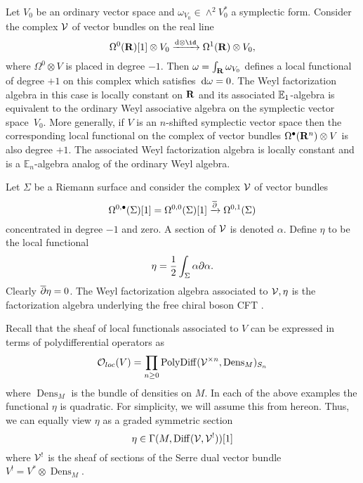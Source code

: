 \documentclass[11pt]{amsart}
\renewcommand{\op}{\operatorname}
\begin{document}
\begin{eg}
Let $V_0$ be an ordinary vector space and $\omega_{V_0} \in \wedge^2 V_0^*$ a symplectic form.
Consider the complex $\mathcal V$ of vector bundles on the real line
\begin{equation}
\Omega^0(\R) [1]\otimes V_0 \xto{\d \otimes \id} \Omega^1 (\R) \otimes V_0 ,
\end{equation}
where $\Omega^0\otimes V$ is placed in degree $-1$.
Then $\omega = \int_{\mathbf{R}} \omega_{V_0}$ defines a local functional of degree $+1$ on this complex which satisfies~${\rm d} \omega = 0$.
The Weyl factorization algebra in this case is locally constant on $\mathbf{R}$ and its associated $\mathbb E_1$-algebra is equivalent to the ordinary Weyl associative algebra on the symplectic vector space~$V_0$.
More generally, if $V$ is an $n$-shifted symplectic vector space then the corresponding local functional on the complex of vector bundles $\Omega^\bullet(\mathbf{R}^n) \otimes V$ is also degree $+1$.
The associated Weyl factorization algebra is locally constant and is a $\mathbb{E}_n$-algebra analog of the ordinary Weyl algebra.
\end{eg}

\begin{eg}
  Let $\Sigma$ be a Riemann surface and consider the complex $\mathcal V$ of vector bundles
  \begin{equation}
    \Omega^{0,\bullet}(\Sigma)[1] = \Omega^{0,0}(\Sigma)[1] \xrightarrow{\overline{\partial}} \Omega^{0,1}(\Sigma)
  \end{equation}
  concentrated in degree $-1$ and zero.
  A section of $\mathcal V$ is denoted $\alpha$.
  Define $\eta$ to be the local functional
  \begin{equation}
    \eta = \frac12 \int_{\Sigma}\alpha \partial \alpha .
  \end{equation}
  Clearly $\overline{\partial} \eta = 0$.
  The Weyl factorization algebra associated to $\mathcal V,\eta$ is the factorization algebra underlying the free chiral boson CFT \cite[??]{CG}.
\end{eg}

Recall that the sheaf of local functionals associated to $V$ can be expressed in terms of polydifferential operators as
\begin{equation}
\oloc(V)= \prod_{n \geq 0} \op{PolyDiff}(\cV^{\times n} , \op{Dens}_{M})_{{S_{n}}}
\end{equation}
where $\op{Dens}_{M}$ is the bundle of densities on $M$.
In each of the above examples the functional $\eta$ is quadratic.
For simplicity, we will assume this from hereon.
Thus, we can equally view $\eta$ as a graded symmetric section
\begin{equation}
\eta \in \Gamma(M, \op{Diff}(\cV, \cV^!))[1]
\end{equation}
where $\mathcal V^{!}$ is the sheaf of sections of the Serre dual vector bundle $V^{!} = V^{*} \otimes \op{Dens}_M$.
\end{document}
